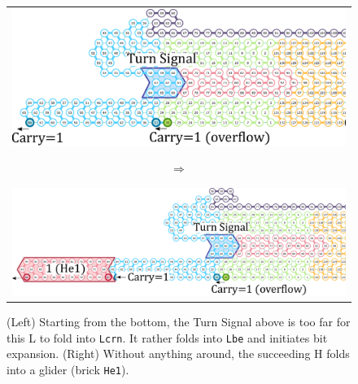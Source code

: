 \documentclass[twocolumn]{svjour3}
\begin{document}
%


\begin{figure}[tb]
\begin{tabular}{c}
 \begin{minipage}{0.4\linewidth}
\centering
\includegraphics[width=\linewidth]{fig/svg/CounterEx14_2.pdf}
\end{minipage}
\begin{minipage}{0.05\linewidth}
\centering
{\large $\Rightarrow$}
\end{minipage}
 \begin{minipage}{0.5\linewidth}
\centering
\includegraphics[width=\linewidth]{fig/svg/CounterEx15_2.pdf}
\end{minipage}
\end{tabular}

\caption{
(Left) Starting from the bottom, the Turn Signal above is too far for this L to fold into \texttt{Lcrn}.
It rather folds into \texttt{Lbe} and initiates bit expansion.
(Right) Without anything around, the succeeding H folds into a glider (brick \texttt{He1}).
}
\label{fig:overflowex2-3}
\end{figure}
\end{document}

